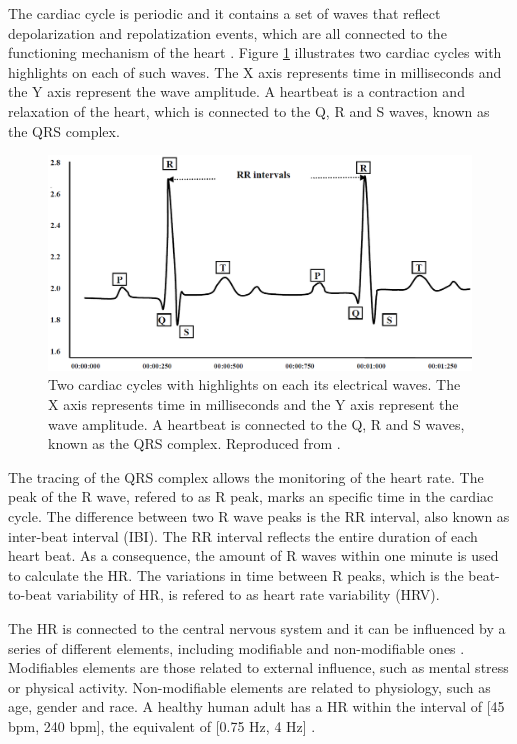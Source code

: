 The cardiac cycle is periodic and it contains a set of waves that reflect depolarization and repolatization events, which are all connected to the functioning mechanism of the heart \parencite{yanowitz2012introduction}. Figure \ref{fig:rr-interval} illustrates two cardiac cycles with highlights on each of such waves. The X axis represents time in milliseconds and the Y axis represent the wave amplitude. A heartbeat is a contraction and relaxation of the heart, which is connected to the Q, R and S waves, known as the QRS complex.

\begin{figure}[h!]
    \centering
    \includegraphics[width=1.0\linewidth]{Content/figures/rr-interval.png}
    \caption{Two cardiac cycles with highlights on each its electrical waves. The X axis represents time in milliseconds and the Y axis represent the wave amplitude. A heartbeat is connected to the Q, R and S waves, known as the QRS complex. Reproduced from \textcite{ahmed2010heart}.}
    \label{fig:rr-interval}
\end{figure}

The tracing of the QRS complex allows the monitoring of the heart rate. The peak of the R wave, refered to as R peak, marks an specific time in the cardiac cycle. The difference between two R wave peaks is the RR interval, also known as inter-beat interval (IBI). The RR interval reflects the entire duration of each heart beat. As a consequence, the amount of R waves within one minute is used to calculate the HR. The variations in time between R peaks, which is the beat-to-beat variability of HR, is refered to as heart rate variability (HRV).

The HR is connected to the central nervous system and it can be influenced by a series of different elements, including modifiable and non-modifiable ones \parencite{valentini2009variables}. Modifiables elements are those related to external influence, such as mental stress or physical activity. Non-modifiable elements are related to physiology, such as age, gender and race. A healthy human adult has a HR within the interval of [45 bpm, 240 bpm], the equivalent of [0.75 Hz, 4 Hz] \parencite{li2014remote}.

